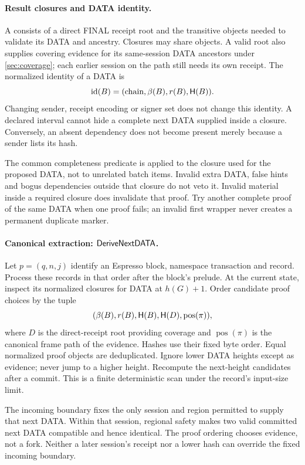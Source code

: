 \paragraph{Result closures and DATA identity.}
A  consists of a direct FINAL receipt root and
the transitive objects needed to validate its DATA and ancestry.
Closures may share objects. A valid root also supplies covering evidence
for its same-session DATA ancestors under \cref{sec:coverage}; each
earlier session on the path still needs its own receipt. The normalized
identity of a DATA is
\[
 \operatorname{id}(B)=(\text{chain},\beta(B),r(B),\mathsf H(B)).
\]
Changing sender, receipt encoding or signer set does not change this
identity. A declared interval cannot hide a complete next DATA supplied
inside a closure. Conversely, an absent dependency does not become
present merely because a sender lists its hash.

The common completeness predicate is applied to the closure used for
the proposed DATA, not to unrelated batch items. Invalid extra DATA,
false hints and bogus dependencies outside that closure do not veto it.
Invalid material inside a required closure does invalidate that proof.
Try another complete proof of the same DATA when one proof fails; an
invalid first wrapper never creates a permanent duplicate marker.

\paragraph{Canonical extraction: $\mathsf{DeriveNextDATA}$.}
Let $p=(q,n,j)$ identify an Espresso block, namespace transaction and
record. Process these records in that order after the block's prelude.
At the current state, inspect its normalized closures for DATA at
$h(G)+1$. Order candidate proof choices by the tuple
\[
 (\beta(B),r(B),\mathsf H(B),\mathsf H(D),\operatorname{pos}(\pi)),
\]
where $D$ is the direct-receipt root providing coverage and
$\operatorname{pos}(\pi)$ is the canonical frame path of the evidence.
Hashes use their fixed byte order. Equal normalized proof objects are
deduplicated. Ignore lower DATA heights except as evidence; never jump
to a higher height. Recompute the next-height candidates after a commit.
This is a finite deterministic scan under the record's input-size limit.

The incoming boundary fixes the only session and region permitted to
supply that next DATA. Within that session, regional safety makes two
valid committed next DATA compatible and hence identical. The proof
ordering chooses evidence, not a fork. Neither a later session's
receipt nor a lower hash can override the fixed incoming boundary.

